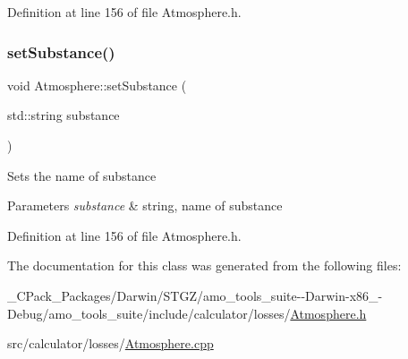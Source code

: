 Definition at line 156 of file Atmosphere.\+h.

\mbox{\label{class_atmosphere_aa92f55a1f07304f3e57fdfb8ece65d82}} 
\subsubsection{\texorpdfstring{set\+Substance()}{setSubstance()}\hspace{0.1cm}{\footnotesize\ttfamily [3/3]}}
{\footnotesize\ttfamily void Atmosphere\+::set\+Substance (\begin{DoxyParamCaption}\item[{std\+::string}]{substance }\end{DoxyParamCaption})\hspace{0.3cm}{\ttfamily [inline]}}

Sets the name of substance 
\begin{DoxyParams}{Parameters}
{\em substance} & string, name of substance \\
\hline
\end{DoxyParams}


Definition at line 156 of file Atmosphere.\+h.



The documentation for this class was generated from the following files\+:\begin{DoxyCompactItemize}
\item 
\+\_\+\+C\+Pack\+\_\+\+Packages/\+Darwin/\+S\+T\+G\+Z/amo\+\_\+tools\+\_\+suite-\/-\/\+Darwin-\/x86\+\_-\/\+Debug/amo\+\_\+tools\+\_\+suite/include/calculator/losses/\hyperlink{___c_pack___packages_2_darwin_2_s_t_g_z_2amo__tools__suite--_darwin-x86__64-_debug_2amo__tools__7727b2302b92ae6542446d85da658463}{Atmosphere.\+h}\item 
src/calculator/losses/\hyperlink{_atmosphere_8cpp}{Atmosphere.\+cpp}\end{DoxyCompactItemize}
